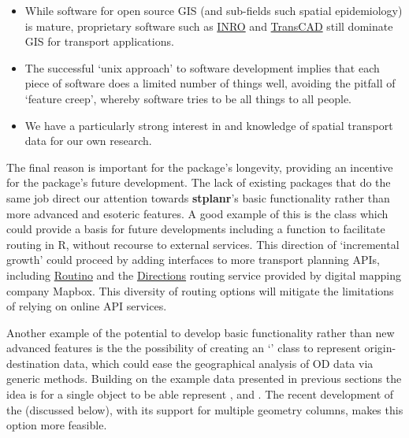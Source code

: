 \begin{itemize}
\tightlist
  \item While software for open source GIS (and sub-fields such spatial epidemiology) is mature,  proprietary software such as \href{https://www.inrosoftware.com/en/products/emme/}{INRO} and  \href{http://www.caliper.com/tcovu.htm}{TransCAD} still dominate GIS for transport applications.
  \item The successful `unix approach' to software development implies that each piece of software does a limited number of things well, avoiding the pitfall of `feature creep', whereby software tries to be all things to all people.
  \item We have a particularly strong interest in and knowledge of spatial transport data for our own research.
\end{itemize}

The final reason is important for the package's longevity, providing an incentive for the package's future development.
The lack of existing packages that do the same job direct our attention towards \textbf{stplanr}'s basic functionality rather than more advanced and esoteric features.
A good example of this is the  class which could provide a basis for future developments including a  function to facilitate routing in R, without recourse to external services.
This direction of `incremental growth' could proceed by adding interfaces to more transport planning APIs, including \href{https://www.routino.org/uk/}{Routino} and the \href{https://www.mapbox.com/directions/}{Directions} routing service provided by digital mapping company Mapbox.
This diversity of routing options will mitigate the limitations of relying on online API services.

Another example of the potential to develop basic functionality rather than new advanced features is the the possibility of creating an `' class to represent origin-destination data, which could ease the geographical analysis of OD data via generic methods.
Building on the example data presented in previous sections the idea is for a single  object to be able represent ,  and .
The recent development of the  (discussed below), with its support for multiple geometry columns, makes this option more feasible.

